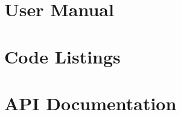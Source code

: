 \documentclass[twoside]{./class/masterthesis}
\begin{document}












\printbibliography[heading=bibintoc]



\appendix

\chapter{User Manual}


\chapter{Code Listings}


\chapter{API Documentation}


% 

\end{document}
